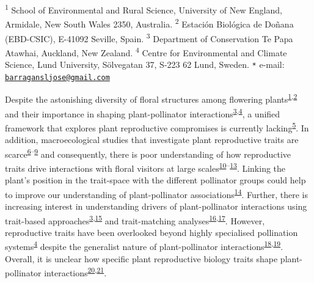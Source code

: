 \documentclass[
  12pt,
  a4paper,
]{article}
\begin{document}
\textsuperscript{1} School of Environmental and Rural Science, University of New England, Armidale, New South Wales 2350, Australia. \textsuperscript{2} Estación Biológica de Doñana (EBD-CSIC), E-41092 Seville, Spain. \textsuperscript{3} Department of Conservation \textbar{} Te Papa Atawhai, Auckland, New Zealand. \textsuperscript{4} Centre for Environmental and Climate Science, Lund University, Sölvegatan 37, S-223 62 Lund, Sweden. \texttt{*} e-mail: \href{mailto:barragansljose@gmail.com}{\nolinkurl{barragansljose@gmail.com}}

\doublespacing
\vspace{5mm}
\normalsize

Despite the astonishing diversity of floral structures among flowering plants\textsuperscript{\protect\hyperlink{ref-barrett2002}{1},\protect\hyperlink{ref-schiestl2013}{2}} and their importance in shaping plant-pollinator interactions\textsuperscript{\protect\hyperlink{ref-fenster2004}{3},\protect\hyperlink{ref-dellinger2020}{4}}, a unified framework that explores plant reproductive compromises is currently lacking\textsuperscript{\protect\hyperlink{ref-roddy2021}{5}}. In addition, macroecological studies that investigate plant reproductive traits are scarce\textsuperscript{\protect\hyperlink{ref-baude2016}{6}--\protect\hyperlink{ref-moeller2017}{9}} and consequently, there is poor understanding of how reproductive traits drive interactions with floral visitors at large scales\textsuperscript{\protect\hyperlink{ref-sargent2008}{10}--\protect\hyperlink{ref-ruger2018}{13}}. Linking the plant's position in the trait-space with the different pollinator groups could help to improve our understanding of plant-pollinator associations\textsuperscript{\protect\hyperlink{ref-dehling2016}{14}}. Further, there is increasing interest in understanding drivers of plant-pollinator interactions using trait-based approaches\textsuperscript{\protect\hyperlink{ref-fenster2004}{3},\protect\hyperlink{ref-rosas2014}{15}} and trait-matching analyses\textsuperscript{\protect\hyperlink{ref-stang2009}{16},\protect\hyperlink{ref-bartomeus2016}{17}}. However, reproductive traits have been overlooked beyond highly specialised pollination systems\textsuperscript{\protect\hyperlink{ref-dellinger2020}{4}} despite the generalist nature of plant-pollinator interactions\textsuperscript{\protect\hyperlink{ref-waser1996}{18},\protect\hyperlink{ref-olesen2002}{19}}. Overall, it is unclear how specific plant reproductive biology traits shape plant-pollinator interactions\textsuperscript{\protect\hyperlink{ref-tur2013}{20},\protect\hyperlink{ref-devaux2014}{21}}.
\end{document}
